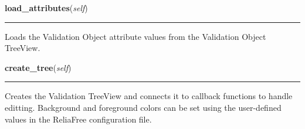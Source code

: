     \label{reliafree:validation:Validation:load_attributes}

    \vspace{0.5ex}

\hspace{.8\funcindent}\begin{boxedminipage}{\funcwidth}

    \raggedright \textbf{load\_attributes}(\textit{self})

    \vspace{-1.5ex}

    \rule{\textwidth}{0.5\fboxrule}
\setlength{\parskip}{2ex}
    Loads the Validation Object attribute values from the Validation Object
    TreeView.

\setlength{\parskip}{1ex}
    \end{boxedminipage}

    \label{reliafree:validation:Validation:create_tree}

    \vspace{0.5ex}

\hspace{.8\funcindent}\begin{boxedminipage}{\funcwidth}

    \raggedright \textbf{create\_tree}(\textit{self})

    \vspace{-1.5ex}

    \rule{\textwidth}{0.5\fboxrule}
\setlength{\parskip}{2ex}
    Creates the Validation TreeView and connects it to callback functions 
    to handle editting.  Background and foreground colors can be set using 
    the user-defined values in the ReliaFree configuration file.

\setlength{\parskip}{1ex}
    \end{boxedminipage}

    \label{reliafree:validation:Validation:load_tree}

    \vspace{0.5ex}

